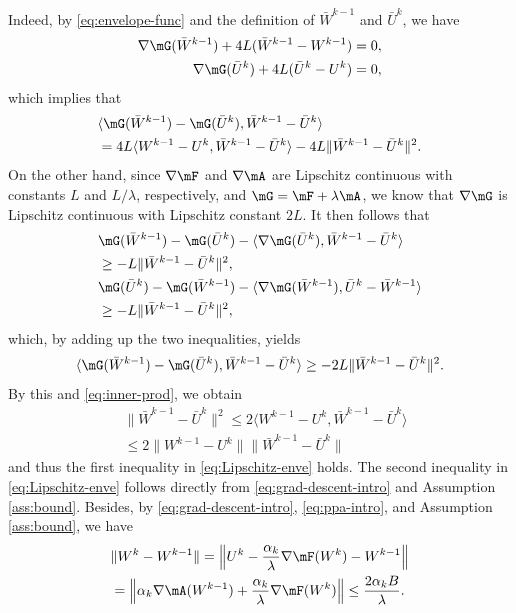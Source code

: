 Indeed, by \eqref{eq:envelope-func} and the definition of $\bar{W}^{k-1}$ and $\bar{U}^k$, 
we have
$$ 
\begin{aligned}
\nabla \mG(\bar{W}^{k-1}) + 4L(\bar{W}^{k-1} - W^{k-1}) & = 0, \\
\nabla \mG(\bar{U}^{k}) + 4L(\bar{U}^{k} -U^{k}) & = 0, 
\end{aligned}
$$
which implies that
\begin{equation}
\label{eq:inner-prod}
\begin{aligned}
& \langle \mG(\bar{W}^{k-1}) - \mG(\bar{U}^k), \bar{W}^{k-1} - \bar{U}^k \rangle \\
& = 4L\langle W^{k-1} - U^k, \bar{W}^{k-1} - \bar{U}^k \rangle - 4L\|\bar{W}^{k-1} - \bar{U}^k\|^2.
\end{aligned}
\end{equation} 
On the other hand, since $\nabla \mF$ and $\nabla \mA$ are Lipschitz continuous with constants $L$ and $L/\lambda$, respectively, and $\mG = \mF + \lambda\mA$, we know that $\nabla \mG$ is Lipschitz continuous with Lipschitz constant $2L$. It then follows that
\begin{align*}
& \mG(\bar{W}^{k-1}) - \mG(\bar{U}^k) - \langle \nabla \mG(\bar{U}^k), \bar{W}^{k-1} - \bar{U}^k \rangle \\
& \geq -L\|\bar{W}^{k-1} - \bar{U}^k\|^2, \\
& \mG(\bar{U}^k) - \mG(\bar{W}^{k-1}) - \langle \nabla \mG(\bar{W}^{k-1}), \bar{U}^k - \bar{W}^{k-1} \rangle \\
& \geq -L\|\bar{W}^{k-1} - \bar{U}^k\|^2,
\end{align*}
which, by adding up the two inequalities, yields
$$ \langle \mG(\bar{W}^{k-1}) - \mG(\bar{U}^k), \bar{W}^{k-1} - \bar{U}^k \rangle \geq -2L\|\bar{W}^{k-1} - \bar{U}^k\|^2. $$
By this and \eqref{eq:inner-prod}, we obtain
$$ 
\begin{aligned}
& \|\bar{W}^{k-1} - \bar{U}^k\|^2 \leq 2\langle W^{k-1} - U^k, \bar{W}^{k-1} - \bar{U}^k \rangle \\
& \leq 2\|W^{k-1} - U^k\|\|\bar{W}^{k-1} - \bar{U}^k\| 
\end{aligned}
$$
and thus the first inequality in \eqref{eq:Lipschitz-enve} holds. The second inequality in \eqref{eq:Lipschitz-enve} follows directly from \eqref{eq:grad-descent-intro} and Assumption \ref{ass:bound}. Besides, by \eqref{eq:grad-descent-intro}, \eqref{eq:ppa-intro}, and Assumption \ref{ass:bound}, we have
\begin{equation}
\label{eq:wk-wk-1}
\begin{aligned}
& \|W^k - W^{k-1}\| = \left\| U^k - \frac{\alpha_k}{\lambda}\nabla \mF(W^k) - W^{k-1}\right\| \\
& = \left\|\alpha_k\nabla \mA(W^{k-1}) + \frac{\alpha_k}{\lambda}\nabla\mF(W^k)\right\| \leq \frac{2\alpha_kB}{\lambda}.
\end{aligned}
\end{equation}
